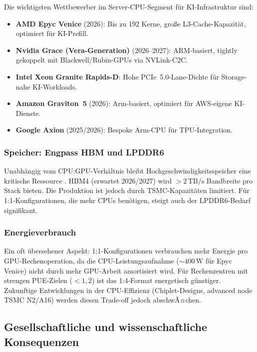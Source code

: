 ﻿\documentclass[a4paper,12pt]{article}
\theoremstyle{definition}
\begin{document}
Die wichtigsten Wettbewerber im Server-CPU-Segment f\"ur KI-Infrastruktur sind:
\begin{itemize}
  \item \textbf{AMD Epyc Venice} (2026): Bis zu 192 Kerne, gro\ss e
        L3-Cache-Kapazit\"at, optimiert f\"ur KI-Prefill.
  \item \textbf{Nvidia Grace (Vera-Generation)} (2026--2027): ARM-basiert,
        tightly gekoppelt mit Blackwell/Rubin-GPUs via NVLink-C2C.
  \item \textbf{Intel Xeon Granite Rapids-D}: Hohe PCIe~5.0-Lane-Dichte
        f\"ur Storage-nahe KI-Workloads.
  \item \textbf{Amazon Graviton~5} (2026): Arm-basiert, optimiert f\"ur
        AWS-eigene KI-Dienste.
  \item \textbf{Google Axion} (2025/2026): Bespoke Arm-CPU f\"ur TPU-Integration.
\end{itemize}

\subsubsection{Speicher: Engpass HBM und LPDDR6}

Unabh\"angig vom CPU:GPU-Verh\"altnis bleibt Hochgeschwindigkeitsspeicher
eine kritische Ressource \cite{computerbase2026}. HBM4 (erwartet 2026/2027)
wird $>2\,\text{TB/s}$ Bandbreite pro Stack bieten. Die Produktion ist
jedoch durch TSMC-Kapazit\"aten limitiert. F\"ur 1:1-Konfigurationen, die
mehr CPUs ben\"otigen, steigt auch der LPDDR6-Bedarf signifikant.

\subsubsection{Energieverbrauch}

Ein oft \"ubersehener Aspekt: 1:1-Konfigurationen verbrauchen mehr Energie
pro GPU-Rechenoperation, da die CPU-Leistungsaufnahme ($\sim 400\,\text{W}$
f\"ur Epyc Venice) nicht durch mehr GPU-Arbeit amortisiert wird. F\"ur
Rechenzentren mit strengen PUE-Zielen ($<1{,}2$) ist das 1:4-Format
energetisch g\"unstiger. Zukunftige Entwicklungen in der CPU-Effizienz
(Chiplet-Designs, advanced node TSMC N2/A16) werden diesen Trade-off
jedoch abschwÃ¤chen.

\subsection{Gesellschaftliche und wissenschaftliche Konsequenzen}
\end{document}
